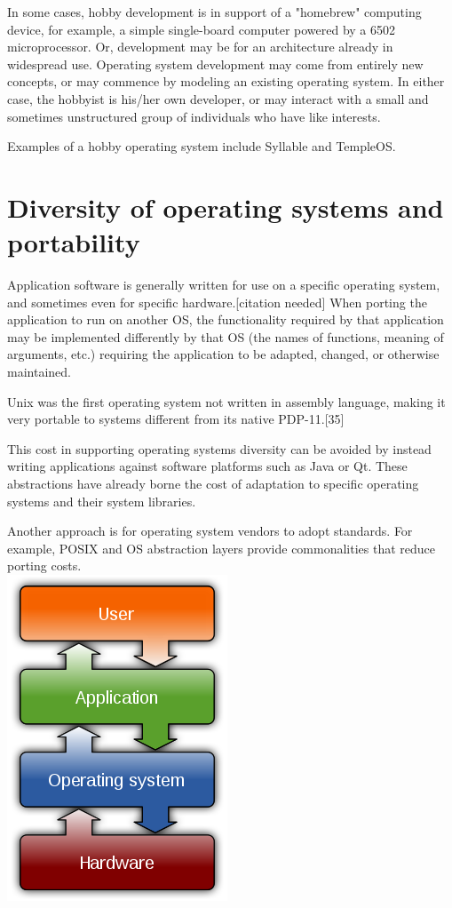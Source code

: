 \documentclass[oneside, 11 pt]{report}
\begin{document}
In some cases, hobby development is in support of a "homebrew" computing device, for example, a simple single-board computer powered by a 6502 microprocessor. Or, development may be for an architecture already in widespread use. Operating system development may come from entirely new concepts, or may commence by modeling an existing operating system. In either case, the hobbyist is his/her own developer, or may interact with a small and sometimes unstructured group of individuals who have like interests.

Examples of a hobby operating system include Syllable and TempleOS.
\section{Diversity of operating systems and portability}
Application software is generally written for use on a specific operating system, and sometimes even for specific hardware.[citation needed] When porting the application to run on another OS, the functionality required by that application may be implemented differently by that OS (the names of functions, meaning of arguments, etc.) requiring the application to be adapted, changed, or otherwise maintained.

Unix was the first operating system not written in assembly language, making it very portable to systems different from its native PDP-11.[35]

This cost in supporting operating systems diversity can be avoided by instead writing applications against software platforms such as Java or Qt. These abstractions have already borne the cost of adaptation to specific operating systems and their system libraries.

Another approach is for operating system vendors to adopt standards. For example, POSIX and OS abstraction layers provide commonalities that reduce porting costs.\\
\includegraphics[width = 170 pt]{img.jpg}
\end{document}
